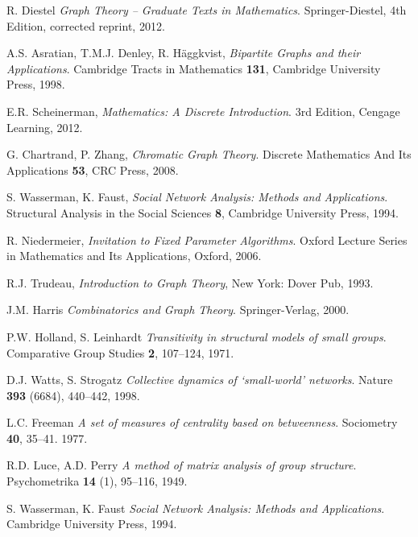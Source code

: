 \cleardoublepage
{}
{}
\begin{thebibliography}{99}

    R. Diestel
    \emph{Graph Theory -- Graduate Texts in Mathematics}.
    Springer-Diestel,
    4th Edition, corrected reprint,
    2012.

  A.S. Asratian, T.M.J. Denley, R. Häggkvist,
  \emph{Bipartite Graphs and their Applications}.
  Cambridge Tracts in Mathematics \textbf{131},
  Cambridge University Press,
  1998.

  E.R. Scheinerman, 
  \emph{Mathematics: A Discrete Introduction}.
  3rd Edition,
  Cengage Learning,
  2012.

  G. Chartrand, P. Zhang,
  \emph{Chromatic Graph Theory}.
  Discrete Mathematics And Its Applications \textbf{53},
  CRC Press,
  2008.

  S. Wasserman, K. Faust,
  \emph{Social Network Analysis: Methods and Applications}.
  Structural Analysis in the Social Sciences \textbf{8},
  Cambridge University Press,
  1994.

  R. Niedermeier,
  \emph{Invitation to Fixed Parameter Algorithms}.
  Oxford Lecture Series in Mathematics and Its Applications,
  Oxford,
  2006.

  R.J. Trudeau,
  \emph{Introduction to Graph Theory},
  New York: Dover Pub,
  1993.

  J.M. Harris
  \emph{Combinatorics and Graph Theory}.
  Springer-Verlag,
  2000.
  
  P.W. Holland, S. Leinhardt
  \emph{Transitivity in structural models of small groups}.
  Comparative Group Studies \textbf{2}, 107–124,
  1971.

  D.J. Watts, S. Strogatz
  \emph{Collective dynamics of `small-world' networks}.
  Nature \textbf{393} (6684), 440–442,
  1998.
  
  L.C. Freeman
  \emph{A set of measures of centrality based on betweenness}.
  Sociometry \textbf{40}, 35–41.
  1977.

  R.D. Luce, A.D. Perry
  \emph{A method of matrix analysis of group structure}.
  Psychometrika \textbf{14} (1), 95–116,
  1949.

  S. Wasserman, K. Faust
  \emph{Social Network Analysis: Methods and Applications}.
  Cambridge University Press,
  1994.


\end{thebibliography}
